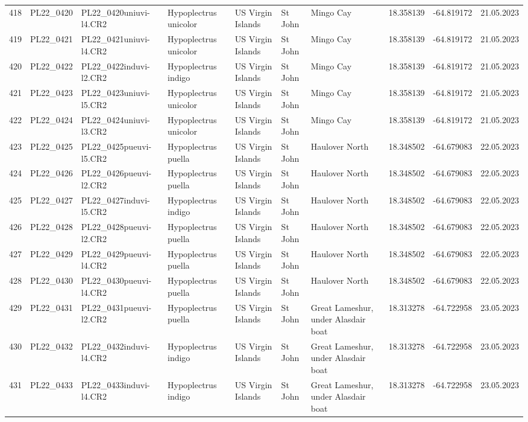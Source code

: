 \begin{table}[ht]
\begin{tabular}{rlllllllll}
  418 & PL22\_0420 & PL22\_0420uniuvi-l4.CR2 & Hypoplectrus unicolor & US Virgin Islands & St John & Mingo Cay & 18.358139 & -64.819172 & 21.05.2023 \\ 
  419 & PL22\_0421 & PL22\_0421uniuvi-l4.CR2 & Hypoplectrus unicolor & US Virgin Islands & St John & Mingo Cay & 18.358139 & -64.819172 & 21.05.2023 \\ 
  420 & PL22\_0422 & PL22\_0422induvi-l2.CR2 & Hypoplectrus indigo & US Virgin Islands & St John & Mingo Cay & 18.358139 & -64.819172 & 21.05.2023 \\ 
  421 & PL22\_0423 & PL22\_0423uniuvi-l5.CR2 & Hypoplectrus unicolor & US Virgin Islands & St John & Mingo Cay & 18.358139 & -64.819172 & 21.05.2023 \\ 
  422 & PL22\_0424 & PL22\_0424uniuvi-l3.CR2 & Hypoplectrus unicolor & US Virgin Islands & St John & Mingo Cay & 18.358139 & -64.819172 & 21.05.2023 \\ 
  423 & PL22\_0425 & PL22\_0425pueuvi-l5.CR2 & Hypoplectrus puella & US Virgin Islands & St John & Haulover North & 18.348502 & -64.679083 & 22.05.2023 \\ 
  424 & PL22\_0426 & PL22\_0426pueuvi-l2.CR2 & Hypoplectrus puella & US Virgin Islands & St John & Haulover North & 18.348502 & -64.679083 & 22.05.2023 \\ 
  425 & PL22\_0427 & PL22\_0427induvi-l5.CR2 & Hypoplectrus indigo & US Virgin Islands & St John & Haulover North & 18.348502 & -64.679083 & 22.05.2023 \\ 
  426 & PL22\_0428 & PL22\_0428pueuvi-l2.CR2 & Hypoplectrus puella & US Virgin Islands & St John & Haulover North & 18.348502 & -64.679083 & 22.05.2023 \\ 
  427 & PL22\_0429 & PL22\_0429pueuvi-l4.CR2 & Hypoplectrus puella & US Virgin Islands & St John & Haulover North & 18.348502 & -64.679083 & 22.05.2023 \\ 
  428 & PL22\_0430 & PL22\_0430pueuvi-l4.CR2 & Hypoplectrus puella & US Virgin Islands & St John & Haulover North & 18.348502 & -64.679083 & 22.05.2023 \\ 
  429 & PL22\_0431 & PL22\_0431pueuvi-l2.CR2 & Hypoplectrus puella & US Virgin Islands & St John & Great Lameshur, under Alasdair boat & 18.313278 & -64.722958 & 23.05.2023 \\ 
  430 & PL22\_0432 & PL22\_0432induvi-l4.CR2 & Hypoplectrus indigo & US Virgin Islands & St John & Great Lameshur, under Alasdair boat & 18.313278 & -64.722958 & 23.05.2023 \\ 
  431 & PL22\_0433 & PL22\_0433induvi-l4.CR2 & Hypoplectrus indigo & US Virgin Islands & St John & Great Lameshur, under Alasdair boat & 18.313278 & -64.722958 & 23.05.2023 \\ 

\end{tabular}
\end{table}
